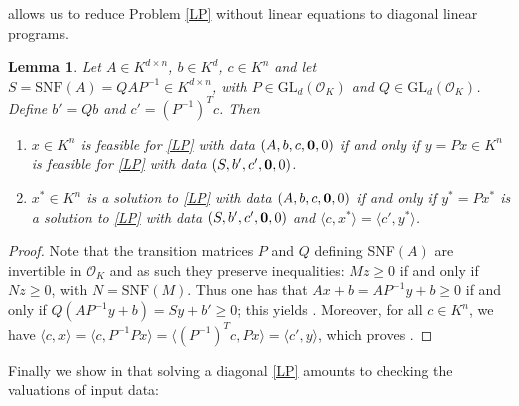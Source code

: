 \documentclass[a4paper,oneside,11pt]{article}
\newtheorem{lemma}[theorem]{Lemma}
\newcommand{\OK}{\mathcal{O}_K}
\newcommand{\GL}{\mathrm{GL}}
\begin{document}
 allows us to reduce Problem \eqref{LP} without linear equations
to diagonal linear programs.

\begin{lemma} \label{solsLP}
  Let $A \in K^{d\times n}$, $b \in K^d$, $c\in K^n$ and let
  $S = \mathrm{SNF}(A) = QAP^{-1} \in K^{d\times n}$, with
  $P \in \GL_d(\OK)$ and $Q\in \GL_d(\OK)$.
  Define $b' = Qb$ and $c' = (P^{-1})^Tc$.
  Then
   \begin{enumerate}
   \item \label{solsLP_item1}
     $x \in K^n$ is feasible for \eqref{LP} with data $(A,b,c,{\bf 0},0)$ if and only if $y = P x \in K^n$ is
     feasible for \eqref{LP} with data $(S,b',c',{\bf 0},0)$.
   \item \label{solsLP_item2}
     $x^* \in K^n$ is a solution to \eqref{LP} with data $(A,b,c,{\bf 0},0)$ if and only if $y^* = P x^*$ is
     a solution to \eqref{LP} with data $(S,b',c',{\bf 0},0)$ and $\langle c,x^* \rangle = \langle c',y^* \rangle$.
   \end{enumerate}
\end{lemma}
\begin{proof}
  Note that the transition matrices $P$ and $Q$ defining SNF$(A)$ are invertible in $\OK$
  and as such they preserve inequalities: $Mz \geq 0$ if and only if $Nz \geq 0$, with
  $N = \mathrm{SNF}(M)$. Thus one has that $Ax+b = AP^{-1}y +b \geq 0$ if and only if
  $Q(AP^{-1}y + b) = Sy + b' \geq 0$; this yields .
  Moreover, for all $c \in K^n$, we have $\langle c, x\rangle = \langle c, P^{-1}Px \rangle =
  \langle (P^{-1})^T c, Px \rangle = \langle c',y\rangle$, which proves
  .
\end{proof}

Finally we show in  that solving a diagonal \eqref{LP} amounts
to checking the valuations of input data:
\end{document}
